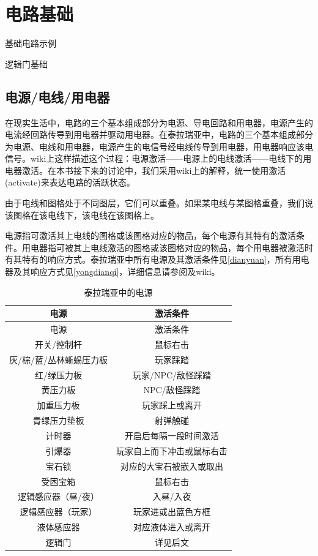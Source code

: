 \chapter{电路基础}\label{dianlujichu}

\begin{introduction}
\item {}
\item 基础电路示例
\item 逻辑门基础
\end{introduction}

\section{电源/电线/用电器}\label{sec10}

在现实生活中，电路的三个基本组成部分为电源、导电回路和用电器，电源产生的电流经回路传导到用电器并驱动用电器。在泰拉瑞亚中，电路的三个基本组成部分为电源、电线和用电器，电源产生的电信号经电线传导到用电器，用电器响应该电信号。wiki上这样描述这个过程：电源激活——电源上的电线激活——电线下的用电器激活。在本书接下来的讨论中，我们采用wiki上的解释，统一使用激活(activate)来表达电路的活跃状态。

由于电线和图格处于不同图层，它们可以重叠。如果某电线与某图格重叠，我们说该图格在该电线下，该电线在该图格上。

电源指可激活其上电线的图格或该图格对应的物品，每个电源有其特有的激活条件。用电器指可被其上电线激活的图格或该图格对应的物品，每个用电器被激活时有其特有的响应方式。泰拉瑞亚中所有电源及其激活条件见\autoref{dianyuan}，所有用电器及其响应方式见\autoref{yongdianqi}，详细信息请参阅及wiki。

\begin{longtable}{|c|c|}
\caption{泰拉瑞亚中的电源}\label{dianyuan}\\\hline
电源					&	激活条件					\\
\hline
\endfirsthead
\hline
电源					&	激活条件					\\
\hline
\endhead
\hline
\endfoot
开关/控制杆				&	鼠标右击					\\
\hline
灰/棕/蓝/丛林蜥蜴压力板	&	玩家踩踏					\\
\hline
红/绿压力板				&	玩家/NPC/敌怪踩踏			\\
\hline
黄压力板				&	NPC/敌怪踩踏				\\
\hline
加重压力板				&	玩家踩上或离开				\\
\hline
青绿压力垫板			&	射弹触碰					\\
\hline
计时器					&	开启后每隔一段时间激活		\\
\hline
引爆器					&	玩家自上而下冲击或鼠标右击	\\
\hline
宝石锁					&	对应的大宝石被嵌入或取出	\\
\hline
受困宝箱				&	鼠标右击					\\
\hline
逻辑感应器（昼/夜）		&	入昼/入夜					\\
\hline
逻辑感应器（玩家）		&	玩家进或出蓝色方框			\\
\hline
液体感应器				&	对应液体进入或离开			\\
\hline
逻辑门					&	详见后文					\\
\end{longtable}


